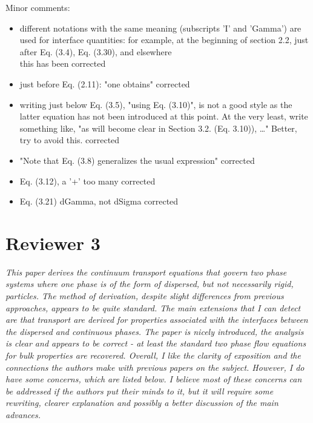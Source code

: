 \documentclass[10pt,a4paper]{article}
\newcommand{\tb}[1]{\color{blue}#1\color{black}}
\begin{document}
Minor comments:
\begin{itemize}
    \item  different notations with the same meaning (subscripts 'I' and 'Gamma') are used for interface quantities: for example, at the beginning of section 2.2, just after Eq. (3.4), Eq. (3.30), and elsewhere
    \\
    \tb{this has been corrected}
    \item just before Eq. (2.11): "one obtains" \tb{corrected}
    \item writing just below Eq. (3.5), "using Eq. (3.10)", is not a good style as the latter equation has not been introduced at this point. At the very least, write something like, "as will become clear in Section 3.2. (Eq. 3.10)), …" Better, try to avoid this. \tb{corrected}
    \item "Note that Eq. (3.8) generalizes the usual expression" \tb{corrected}
    \item Eq. (3.12), a '+' too many \tb{corrected}
    \item Eq. (3.21) dGamma, not dSigma \tb{corrected}
\end{itemize}

\section*{Reviewer 3}

\textit{This paper derives the continuum transport equations that govern two phase systems where
one phase is of the form of dispersed, but not necessarily rigid, particles. The method of
derivation, despite slight differences from previous approaches, appears to be quite standard.
The main extensions that I can detect are that transport are derived for properties associated
with the interfaces between the dispersed and continuous phases. The paper is nicely
introduced, the analysis is clear and appears to be correct - at least the standard two phase
flow equations for bulk properties are recovered. Overall, I like the clarity of exposition and
the connections the authors make with previous papers on the subject.
However, I do have some concerns, which are listed below. I believe most of these concerns
can be addressed if the authors put their minds to it, but it will require some rewriting, clearer
explanation and possibly a better discussion of the main advances.}
\end{document}
